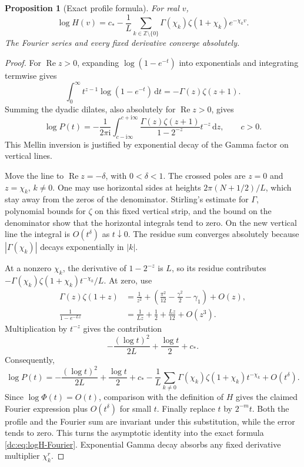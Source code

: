 \documentclass[11pt,a4paper,oneside,openany]{book}
\numberwithin{equation}{chapter}
\newtheorem{proposition}[theorem]{Proposition}
\theoremstyle{definition}
\theoremstyle{remark}
\newcommand{\Z}{\mathbb Z}
\newcommand{\dd}{\,\mathrm d}
\newcommand{\ii}{\mathrm i}
\newcommand{\abs}[1]{\left\lvert #1\right\rvert}
\DeclareMathOperator{\Rea}{Re}
\begin{document}
\begin{proposition}[Exact profile formula]
\label{dc:prop:logH}
For real $v$,
\begin{equation}
 \boxed{\displaystyle
 \log H(v)=c_*-\frac1L\sum_{k\in\Z\setminus\{0\}}
       \Gamma(\chi_k)\zeta(1+\chi_k)e^{-\chi_kv}.}
 \label{dc:eq:logH-Fourier}
\end{equation}
The Fourier series and every fixed derivative converge absolutely.
\end{proposition}
\begin{proof}
For $\Rea z>0$, expanding $\log(1-e^{-t})$ into exponentials and
integrating termwise gives
\[
 \int_0^\infty t^{z-1}\log(1-e^{-t})\dd t
 =-\Gamma(z)\zeta(z+1).
\]
Summing the dyadic dilates, also absolutely for $\Rea z>0$, gives
\begin{equation}
 \log P(t)=-\frac1{2\pi\ii}
 \int_{c-\ii\infty}^{c+\ii\infty}
 \frac{\Gamma(z)\zeta(z+1)}{1-2^{-z}}t^{-z}\dd z,
 \qquad c>0.
 \label{dc:eq:logP-Mellin}
\end{equation}
This Mellin inversion is justified by exponential decay of the
Gamma factor on vertical lines.

Move the line to $\Rea z=-\delta$, with $0<\delta<1$.
The crossed poles are $z=0$ and $z=\chi_k$, $k\ne0$.
One may use horizontal sides at heights
$2\pi(N+1/2)/L$, which stay away from the zeros of the denominator.
Stirling's estimate for $\Gamma$, polynomial bounds for $\zeta$
on this fixed vertical strip, and the bound on the denominator show
that the horizontal integrals tend to zero. On the new vertical
line the integral is $O(t^\delta)$ as $t\downarrow0$.
The residue sum converges absolutely because
$\abs{\Gamma(\chi_k)}$ decays exponentially in $\abs k$.

At a nonzero $\chi_k$, the derivative of $1-2^{-z}$ is $L$, so
its residue contributes
$-\Gamma(\chi_k)\zeta(1+\chi_k)t^{-\chi_k}/L$.
At zero, use
\begin{align*}
 \Gamma(z)\zeta(1+z)
 &=\frac1{z^2}+\left(\frac{\pi^2}{12}
             -\frac{\gamma^2}{2}-\gamma_1\right)+O(z),\\
 \frac1{1-e^{-Lz}}&=\frac1{Lz}+\frac12+\frac{Lz}{12}+O(z^3).
\end{align*}
Multiplication by $t^{-z}$ gives the contribution
\[
 -\frac{(\log t)^2}{2L}+\frac{\log t}{2}+c_*.
\]
Consequently,
\[
 \log P(t)=-\frac{(\log t)^2}{2L}+\frac{\log t}{2}+c_*
 -\frac1L\sum_{k\ne0}\Gamma(\chi_k)\zeta(1+\chi_k)t^{-\chi_k}
 +O(t^\delta).
\]
Since $\log\Phi(t)=O(t)$, comparison with the definition of $H$
gives the claimed Fourier expression plus $O(t^\delta)$ for small
$t$. Finally replace $t$ by $2^{-m}t$. Both the profile and the
Fourier sum are invariant under this substitution, while the error
tends to zero. This turns the asymptotic identity into the exact
formula \cref{dc:eq:logH-Fourier}. Exponential Gamma decay absorbs any
fixed derivative multiplier $\chi_k^r$.
\end{proof}
\end{document}
